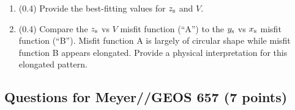 \documentclass[11pt,titlepage,fleqn]{article}
\begin{document}
\begin{enumerate}
\begin{enumerate}
Note 1: Make sure that you do {\em not} use the command \verb+axis equal+. \\
Note 2: You may want to adjust the color scale\footnote{You can adjust the color scale by specifying {\tt caxis([a b])}, where {\tt a} and {\tt b} are your values. This command needs to appear {\em before} you list the {\tt colorbar} command.}, in order to better see the shape of the misfit function.

\item (0.4) Provide the best-fitting values for $z_{\rm s}$ and $V$. 

\item (0.4) Compare the $z_{\rm s}$ vs $V$ misfit function (``A'') to the $y_{\rm s}$ vs $x_{\rm s}$ misfit function (``B'').
Misfit function A is largely of circular shape while misfit function B appears elongated.
Provide a physical interpretation for this elongated pattern.
\end{enumerate}

\end{enumerate}


\subsection*{Questions for Meyer//GEOS 657 (7 points)}
\end{document}
